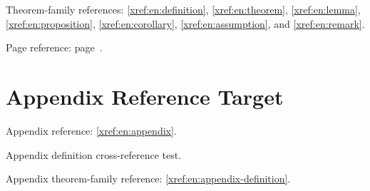 \documentclass[english]{uestcthesis}
\begin{document}
Theorem-family references: \autoref{xref:en:definition}, \autoref{xref:en:theorem},
\autoref{xref:en:lemma}, \autoref{xref:en:proposition}, \autoref{xref:en:corollary},
\autoref{xref:en:assumption}, and \autoref{xref:en:remark}.

Page reference: page~\pageref{xref:en:section}.

\uestcappendix
\chapter{Appendix Reference Target}\label{xref:en:appendix}

Appendix reference: \autoref{xref:en:appendix}.

\begin{definition}\label{xref:en:appendix-definition}
Appendix definition cross-reference test.
\end{definition}

Appendix theorem-family reference: \autoref{xref:en:appendix-definition}.
\end{document}
